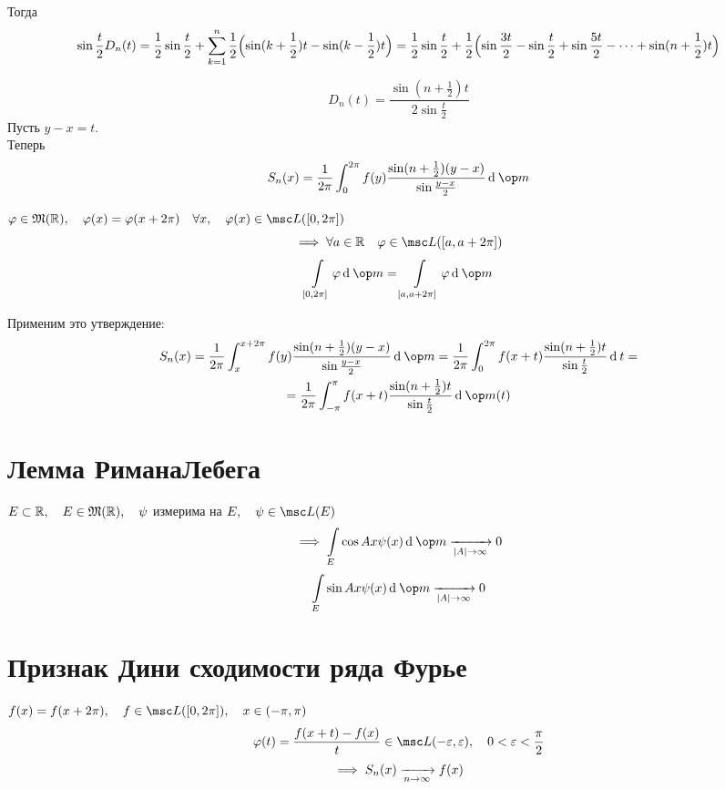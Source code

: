 Тогда
$$ \sin \frac t2 D_n(t) = \frac 12 \sin \frac t2 + \sum_{k = 1}^n \frac12 \Bigl( \sin (k + \frac12) t - \sin (k - \frac12) t \Bigr) =
\frac12 \sin \frac t2 + \frac12 \Bigl( \sin \frac{3t}2 - \sin \frac t 2 + \sin \frac{5t}2 - \dots + \sin (n + \frac12)t \Bigr) $$

$$ D_n(t) = \frac{\sin(n + \frac12)t}{2 \sin \frac t2} $$
Пусть $ y - x = t $. \\
Теперь
$$ S_n(x) = \frac1{2\pi} \int_0^{2\pi} f(y) \frac{\sin (n + \frac12)(y - x)}{\sin \frac{y - x}2} \di \op m $$

\begin{statement}
	$ \phi \in \mathfrak M(\R), \quad \phi(x) = \phi(x + 2\pi) \quad \forall x, \quad \phi(x) \in \msc L([0, 2\pi]) $
	$$ \implies \forall a \in \R \quad \phi \in \msc L([a, a + 2\pi]) $$
	$$ \int\limits_{[0, 2\pi]} \phi \di \op m = \int\limits_{[a, a + 2\pi]} \phi \di \op m $$
\end{statement}

Применим это утверждение:
\begin{multline*}
	S_n(x) = \frac1{2\pi} \int_x^{x + 2\pi} f(y) \frac{\sin (n + \frac12)(y - x)}{\sin \frac{y - x}2} \di \op m = \frac1{2\pi} \int_0^{2\pi} f(x + t) \frac{\sin(n + \frac12)t}{\sin \frac t2} \di t = \\
	= \frac1{2\pi} \int_{-\pi}^\pi f(x + t) \frac{\sin(n + \frac12)t}{\sin \frac t2} \di \op m(t)
\end{multline*}

\section{Лемма РиманаЛебега}

\begin{lemma}
	$ E \subset \mathbb{R}, \quad E \in \mathfrak M(\mathbb{R}), \quad \psi $ измерима на $ E, \quad \psi \in \msc L(E) $
	$$ \implies \int\limits_E \cos A x \psi(x) \di \op m \underarr{|A| \to \infty} 0 $$
	$$ \int\limits_E \sin A x \psi(x) \di \op m \underarr{|A| \to \infty} 0 $$
\end{lemma}

\section{Признак Дини сходимости ряда Фурье}

\begin{theorem}
	$ f(x) = f(x + 2\pi), \quad f \in \msc L([0, 2\pi]), \quad x \in (-\pi, \pi) $
	$$ \phi(t) = \frac{f(x + t) - f(x)}t \in \msc L(-\eps, \eps), \quad 0 < \eps < \frac \pi 2 $$
	$$ \implies S_n(x) \xrightarrow[n \to \infty]{} f(x) $$
\end{theorem}

